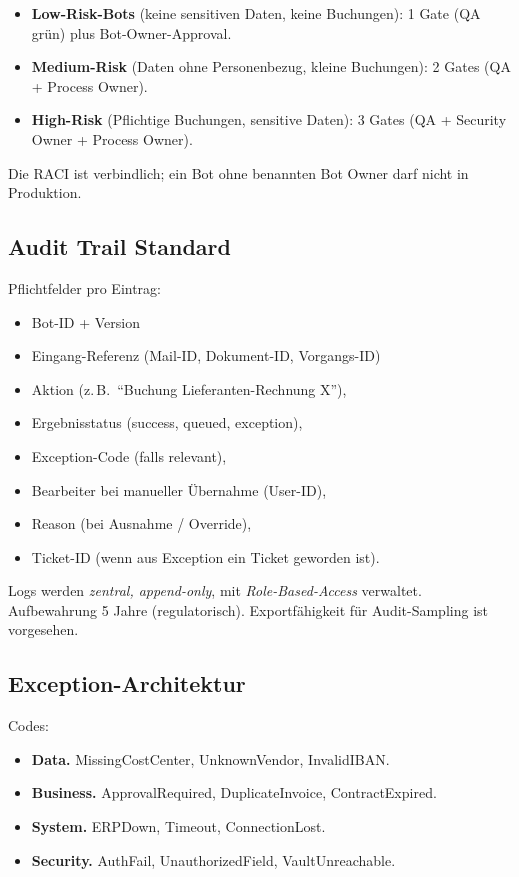 \documentclass[11pt,a4paper,oneside]{article}
\begin{document}
\begin{itemize}
  \item \textbf{Low-Risk-Bots} (keine sensitiven Daten, keine Buchungen): 1 Gate (QA grün) plus Bot-Owner-Approval.
  \item \textbf{Medium-Risk} (Daten ohne Personenbezug, kleine Buchungen): 2 Gates (QA + Process Owner).
  \item \textbf{High-Risk} (Pflichtige Buchungen, sensitive Daten): 3 Gates (QA + Security Owner + Process Owner).
\end{itemize}

Die RACI ist verbindlich; ein Bot ohne benannten Bot Owner darf nicht in Produktion.

\subsection{Audit Trail Standard}

Pflichtfelder pro Eintrag:

\begin{itemize}
  \item Bot-ID + Version
  \item Eingang-Referenz (Mail-ID, Dokument-ID, Vorgangs-ID)
  \item Aktion (z.\,B.\ ``Buchung Lieferanten-Rechnung X''),
  \item Ergebnisstatus (success, queued, exception),
  \item Exception-Code (falls relevant),
  \item Bearbeiter bei manueller Übernahme (User-ID),
  \item Reason (bei Ausnahme / Override),
  \item Ticket-ID (wenn aus Exception ein Ticket geworden ist).
\end{itemize}

Logs werden \emph{zentral, append-only}, mit \emph{Role-Based-Access} verwaltet. Aufbewahrung 5 Jahre (regulatorisch). Exportfähigkeit für Audit-Sampling ist vorgesehen.

\subsection{Exception-Architektur}

Codes:

\begin{itemize}
  \item \textbf{Data.} MissingCostCenter, UnknownVendor, InvalidIBAN.
  \item \textbf{Business.} ApprovalRequired, DuplicateInvoice, ContractExpired.
  \item \textbf{System.} ERPDown, Timeout, ConnectionLost.
  \item \textbf{Security.} AuthFail, UnauthorizedField, VaultUnreachable.
\end{itemize}
\end{document}
